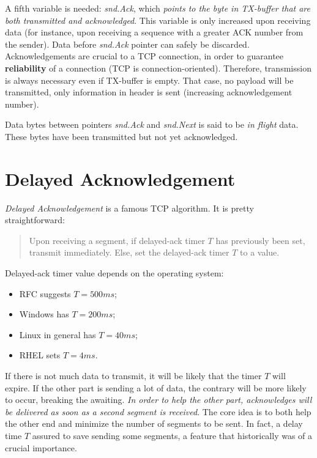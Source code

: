 \documentclass[10pt]{book}
\begin{document}
A fifth variable is needed: \emph{snd.Ack}, which \emph{points to the byte in
TX-buffer that are both transmitted and acknowledged}. This variable is only
increased upon receiving data (for instance, upon receiving a sequence with a
greater ACK number from the sender). Data before \emph{snd.Ack} pointer can
safely be discarded. Acknowledgements are crucial to a TCP connection, in order
to guarantee \textbf{reliability} of a connection (TCP is connection-oriented).
Therefore, transmission is always necessary even if TX-buffer is empty. That
case, no payload will be transmitted, only information in header is sent
(increasing acknowledgement number). 

Data bytes between pointers \emph{snd.Ack} and \emph{snd.Next} is said to
be \emph{in flight} data. These bytes have been transmitted but not yet
acknowledged.


\section{Delayed Acknowledgement}

\emph{Delayed Acknowledgement} is a famous TCP algorithm. It is pretty
straightforward:

\begin{quote}
Upon receiving a segment, if delayed-ack timer $T$ has previously been set,
transmit immediately. Else, set the delayed-ack timer $T$ to a value.
\end{quote}

Delayed-ack timer value depends on the operating system:

\begin{itemize}
	\item RFC suggests $T = 500ms$;
	\item Windows has $T = 200ms$;
	\item Linux in general has $T = 40ms$;
	\item RHEL sets $T = 4ms$.
\end{itemize}

If there is not much data to transmit, it will be likely that the timer $T$
will expire. If the other part is sending a lot of data, the contrary will be
more likely to occur, breaking the awaiting. \emph{In order to help the other
part, acknowledges will be delivered as soon as a second segment is received}.
The core idea is to both help the other end and minimize the number of segments
to be sent. In fact, a delay time $T$ assured to save sending some segments, a
feature that historically was of a crucial importance.
\end{document}
